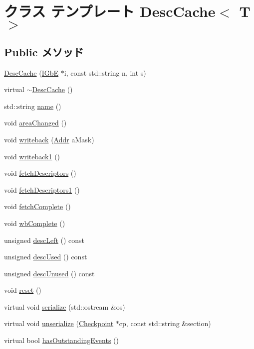 \hypertarget{classIGbE_1_1DescCache}{
\section{クラス テンプレート DescCache$<$ T $>$}
\label{classIGbE_1_1DescCache}
}
\subsection*{Public メソッド}
\begin{DoxyCompactItemize}
\item 
\hyperlink{classIGbE_1_1DescCache_a5d52519add3740ad26acef908669a09f}{DescCache} (\hyperlink{classIGbE}{IGbE} $\ast$i, const std::string n, int s)
\item 
virtual \hyperlink{classIGbE_1_1DescCache_a386ef53292372f92559f7d22782dfa76}{$\sim$DescCache} ()
\item 
std::string \hyperlink{classIGbE_1_1DescCache_af1801e31af6399bccce114ab12575168}{name} ()
\item 
void \hyperlink{classIGbE_1_1DescCache_aa55a03ef5e0e85dfa7860656c57c649a}{areaChanged} ()
\item 
void \hyperlink{classIGbE_1_1DescCache_af6593b85cc3920a68b9a0317053a4416}{writeback} (\hyperlink{base_2types_8hh_af1bb03d6a4ee096394a6749f0a169232}{Addr} aMask)
\item 
void \hyperlink{classIGbE_1_1DescCache_a427d2491d0856a590c1168301f146509}{writeback1} ()
\item 
void \hyperlink{classIGbE_1_1DescCache_a69c2eb368f23448d28ccb10dfa67c250}{fetchDescriptors} ()
\item 
void \hyperlink{classIGbE_1_1DescCache_a2fbe1c3d2d7e697512e63f3d14787e8b}{fetchDescriptors1} ()
\item 
void \hyperlink{classIGbE_1_1DescCache_a23b4635f3979b87b52d2324c4d7ab39a}{fetchComplete} ()
\item 
void \hyperlink{classIGbE_1_1DescCache_a4e5412affaf9bee5874dcbdb032659cf}{wbComplete} ()
\item 
unsigned \hyperlink{classIGbE_1_1DescCache_ad60cb6948516cc9177fc65c07c7a0550}{descLeft} () const 
\item 
unsigned \hyperlink{classIGbE_1_1DescCache_a8e6020ce06b62c70f3aaa6d6222353fb}{descUsed} () const 
\item 
unsigned \hyperlink{classIGbE_1_1DescCache_a73d7e7efbb2dc6340aef1e2f3e4cb02d}{descUnused} () const 
\item 
void \hyperlink{classIGbE_1_1DescCache_ad20897c5c8bd47f5d4005989bead0e55}{reset} ()
\item 
virtual void \hyperlink{classIGbE_1_1DescCache_a53e036786d17361be4c7320d39c99b84}{serialize} (std::ostream \&os)
\item 
virtual void \hyperlink{classIGbE_1_1DescCache_af22e5d6d660b97db37003ac61ac4ee49}{unserialize} (\hyperlink{classCheckpoint}{Checkpoint} $\ast$cp, const std::string \&section)
\item 
virtual bool \hyperlink{classIGbE_1_1DescCache_a09989bc9720a200c8164dc1ef109d70b}{hasOutstandingEvents} ()
\end{DoxyCompactItemize}
